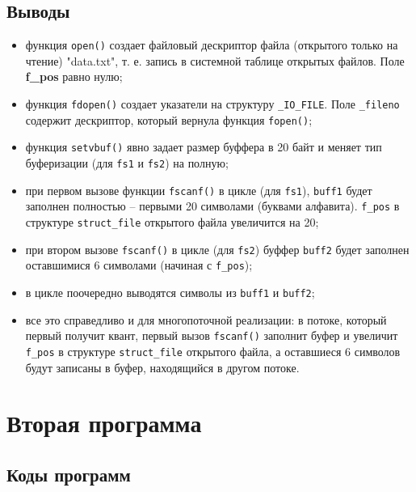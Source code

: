 
\subsection*{Выводы}

\begin{itemize}
	\item функция \texttt{open()} создает файловый дескриптор файла (открытого только на чтение) "data.txt", т. е. запись в системной таблице открытых файлов. Поле \textbf{f\_pos} равно нулю;
	
	\item функция \texttt{fdopen()} создает указатели на структуру \texttt{\_IO\_FILE}. Поле \texttt{\_fileno} содержит дескриптор, который вернула функция \texttt{fopen()};
	
	\item функция \texttt{setvbuf()} явно задает размер буффера в 20 байт и меняет тип буферизации (для \texttt{fs1} и \texttt{fs2}) на полную;
	
	\item при первом вызове функции \texttt{fscanf()} в цикле (для \texttt{fs1}), \texttt{buff1} будет заполнен полностью -- первыми 20 символами (буквами алфавита). \texttt{f\_pos} в структуре \texttt{struct\_file} открытого файла увеличится на 20;
	
	\item при втором вызове \texttt{fscanf()} в цикле (для \texttt{fs2}) буффер \texttt{buff2} будет заполнен оставшимися 6 символами (начиная с \texttt{f\_pos});
	
	\item в цикле поочередно выводятся символы из \texttt{buff1} и \texttt{buff2};
	
	\item все это справедливо и для многопоточной реализации: в потоке, который первый получит квант, первый вызов \texttt{fscanf()} заполнит буфер и увеличит \texttt{f\_pos} в структуре \texttt{struct\_file} открытого файла, а оставшиеся 6 символов будут записаны в буфер, находящийся в другом потоке.
\end{itemize}

\newpage

\section{Вторая программа}

\subsection{Коды программ}

